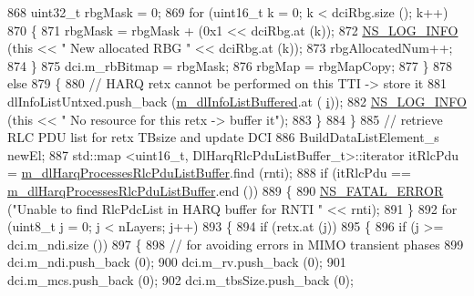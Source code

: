 \begin{DoxyCode}
868                   uint32\_t rbgMask = 0;
869                   \textcolor{keywordflow}{for} (uint16\_t k = 0; k < dciRbg.size (); k++)
870                     \{
871                       rbgMask = rbgMask + (0x1 << dciRbg.at (k));
872                       \hyperlink{group__logging_gafbd73ee2cf9f26b319f49086d8e860fb}{NS\_LOG\_INFO} (\textcolor{keyword}{this} << \textcolor{stringliteral}{" New allocated RBG "} << dciRbg.at (k));
873                       rbgAllocatedNum++;
874                     \}
875                   dci.m\_rbBitmap = rbgMask;
876                   rbgMap = rbgMapCopy;
877                 \}
878               \textcolor{keywordflow}{else}
879                 \{
880                   \textcolor{comment}{// HARQ retx cannot be performed on this TTI -> store it}
881                   dlInfoListUntxed.push\_back (\hyperlink{classns3_1_1RrFfMacScheduler_a4176ffb0eba681a3e3b5be0be1a30771}{m\_dlInfoListBuffered}.at (
      \hyperlink{bernuolliDistribution_8m_a6f6ccfcf58b31cb6412107d9d5281426}{i}));
882                   \hyperlink{group__logging_gafbd73ee2cf9f26b319f49086d8e860fb}{NS\_LOG\_INFO} (\textcolor{keyword}{this} << \textcolor{stringliteral}{" No resource for this retx -> buffer it"});
883                 \}
884             \}
885           \textcolor{comment}{// retrieve RLC PDU list for retx TBsize and update DCI}
886           BuildDataListElement\_s newEl;
887           std::map <uint16\_t, DlHarqRlcPduListBuffer\_t>::iterator itRlcPdu =  
      \hyperlink{classns3_1_1RrFfMacScheduler_a2a6afd0a7df7a71c20382176f6cc9573}{m\_dlHarqProcessesRlcPduListBuffer}.find (rnti);
888           \textcolor{keywordflow}{if} (itRlcPdu == \hyperlink{classns3_1_1RrFfMacScheduler_a2a6afd0a7df7a71c20382176f6cc9573}{m\_dlHarqProcessesRlcPduListBuffer}.end ())
889             \{
890               \hyperlink{group__fatal_ga5131d5e3f75d7d4cbfd706ac456fdc85}{NS\_FATAL\_ERROR} (\textcolor{stringliteral}{"Unable to find RlcPdcList in HARQ buffer for RNTI "} << rnti);
891             \}
892           \textcolor{keywordflow}{for} (uint8\_t j = 0; j < nLayers; j++)
893             \{
894               \textcolor{keywordflow}{if} (retx.at (j))
895                 \{
896                   \textcolor{keywordflow}{if} (j >= dci.m\_ndi.size ())
897                     \{
898                       \textcolor{comment}{// for avoiding errors in MIMO transient phases}
899                       dci.m\_ndi.push\_back (0);
900                       dci.m\_rv.push\_back (0);
901                       dci.m\_mcs.push\_back (0);
902                       dci.m\_tbsSize.push\_back (0);

\end{DoxyCode}
